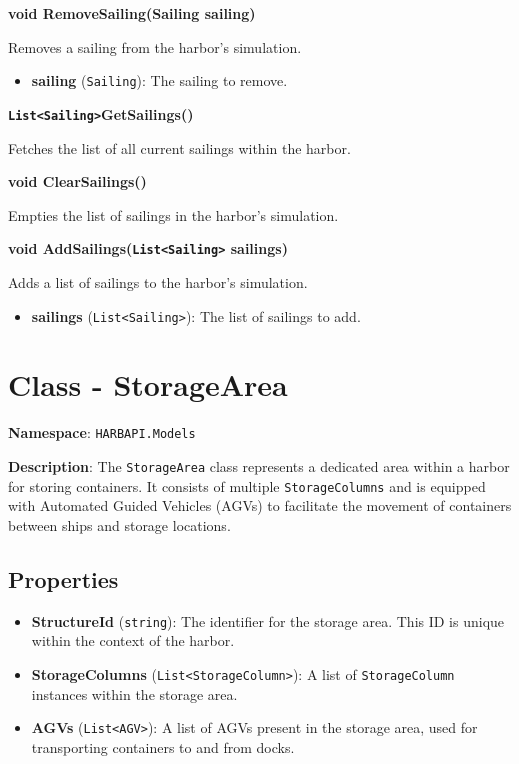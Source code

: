\documentclass[12pt]{article}
\begin{document}
\textbf{void RemoveSailing(Sailing sailing)}

Removes a sailing from the harbor's simulation.

\begin{itemize}
    \item \textbf{sailing} (\texttt{Sailing}): The sailing to remove.
\end{itemize}

\textbf{\texttt{List<Sailing>}GetSailings()}

Fetches the list of all current sailings within the harbor.

\textbf{void ClearSailings()}

Empties the list of sailings in the harbor's simulation.

\textbf{void AddSailings(\texttt{List<Sailing>} sailings)}

Adds a list of sailings to the harbor's simulation.

\begin{itemize}
    \item \textbf{sailings} (\texttt{List<Sailing>}): The list of sailings to add.
\end{itemize}

\newpage

\section*{Class - StorageArea}

\textbf{Namespace}: \texttt{HARBAPI.Models}

\textbf{Description}: 
The \texttt{StorageArea} class represents a dedicated area within a harbor for storing containers. It consists of multiple \texttt{StorageColumns} and is equipped with Automated Guided Vehicles (AGVs) to facilitate the movement of containers between ships and storage locations.

\subsection*{Properties}

\begin{itemize}
    \item \textbf{StructureId} (\texttt{string}): The identifier for the storage area. This ID is unique within the context of the harbor.
    \item \textbf{StorageColumns} (\texttt{List<StorageColumn>}): A list of \texttt{StorageColumn} instances within the storage area.
    \item \textbf{AGVs} (\texttt{List<AGV>}): A list of AGVs present in the storage area, used for transporting containers to and from docks.
\end{itemize}
\end{document}
